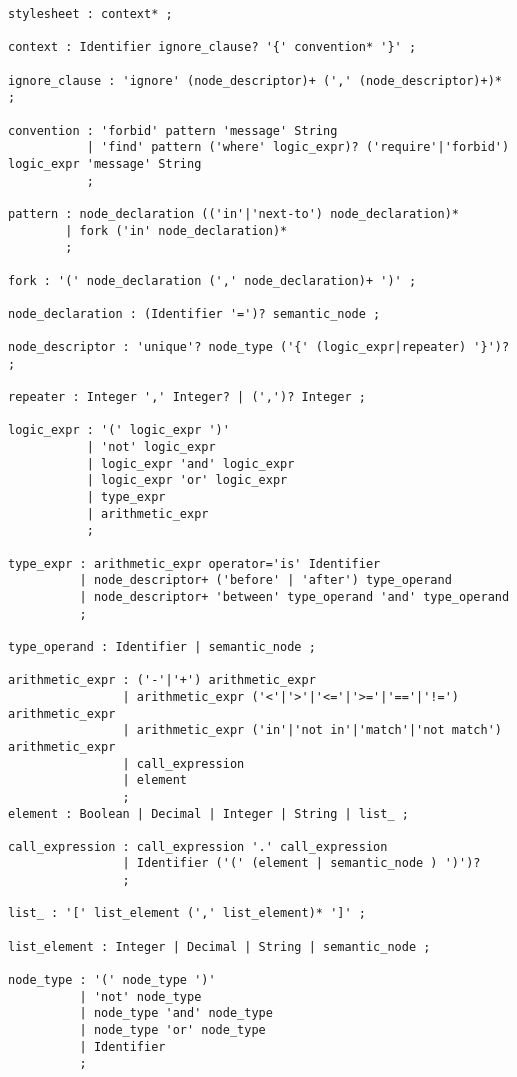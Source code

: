 \begin{snippet}
\begin{verbatim}
stylesheet : context* ;

context : Identifier ignore_clause? '{' convention* '}' ;

ignore_clause : 'ignore' (node_descriptor)+ (',' (node_descriptor)+)* ;

convention : 'forbid' pattern 'message' String
           | 'find' pattern ('where' logic_expr)? ('require'|'forbid') logic_expr 'message' String
           ;

pattern : node_declaration (('in'|'next-to') node_declaration)*
        | fork ('in' node_declaration)*
        ;

fork : '(' node_declaration (',' node_declaration)+ ')' ;

node_declaration : (Identifier '=')? semantic_node ;

node_descriptor : 'unique'? node_type ('{' (logic_expr|repeater) '}')? ;

repeater : Integer ',' Integer? | (',')? Integer ;

logic_expr : '(' logic_expr ')'
           | 'not' logic_expr
           | logic_expr 'and' logic_expr
           | logic_expr 'or' logic_expr
           | type_expr
           | arithmetic_expr
           ;

type_expr : arithmetic_expr operator='is' Identifier
          | node_descriptor+ ('before' | 'after') type_operand
          | node_descriptor+ 'between' type_operand 'and' type_operand
          ;

type_operand : Identifier | semantic_node ;

arithmetic_expr : ('-'|'+') arithmetic_expr
                | arithmetic_expr ('<'|'>'|'<='|'>='|'=='|'!=') arithmetic_expr
                | arithmetic_expr ('in'|'not in'|'match'|'not match') arithmetic_expr
                | call_expression
                | element
                ;
element : Boolean | Decimal | Integer | String | list_ ;

call_expression : call_expression '.' call_expression
                | Identifier ('(' (element | semantic_node ) ')')? 
                ;

list_ : '[' list_element (',' list_element)* ']' ;

list_element : Integer | Decimal | String | semantic_node ;

node_type : '(' node_type ')'
          | 'not' node_type
          | node_type 'and' node_type
          | node_type 'or' node_type
          | Identifier
          ;
\end{verbatim}
\end{snippet}

